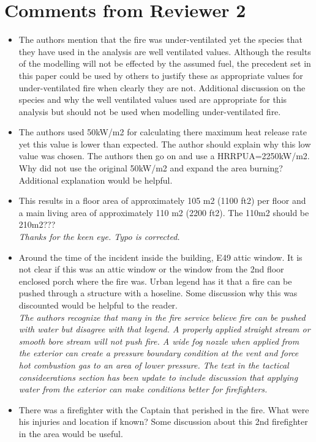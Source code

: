 \documentclass[12pt]{article}
\begin{document}
\section{Comments from Reviewer 2}
\begin{itemize}
 \item The authors mention that the fire was under-ventilated yet the species that they have used in the analysis are well ventilated values.  Although the results of the modelling will not be effected by the assumed fuel, the precedent set in this paper could be used by others to justify these as appropriate values for under-ventilated fire when clearly they are not.  Additional discussion on the species and why the well ventilated values used are appropriate for this analysis but should not be used when modelling under-ventilated fire.
\item The authors used 50kW/m2 for calculating there maximum heat release rate yet this value is lower than expected.  The author should explain why this low value was chosen.  The authors then go on and use a HRRPUA=2250kW/m2.  Why did not use the original 50kW/m2 and expand the area burning?  Additional explanation would be helpful.
\item This results in a floor area of approximately 105 m2 (1100 ft2) per floor and a main living area of approximately 110 m2 (2200 ft2).
The 110m2 should be 210m2??? \\
{\it Thanks for the keen eye. Typo is corrected.}
\item  Around the time of the incident inside the building, E49 attic window.  It is not clear if this was an attic window or the window from the 2nd floor enclosed porch where the fire was.  Urban legend has it that a fire can be pushed through a structure with a hoseline.  Some discussion why this was discounted would be helpful to the reader. \\
{\it The authors recognize that many in the fire service believe fire can be pushed with water but disagree with that legend. A properly applied straight stream or smooth bore stream will not push fire. A wide fog nozzle when applied from the exterior can create a pressure boundary condition at the vent and force hot combustion gas to an area of lower pressure. The text in the tactical consideerations section has been update to include discussion that applying water from the exterior can make conditions better for firefighters.}
\item There was a firefighter with the Captain that perished in the fire.  What were his injuries and location if known?  Some discussion about this 2nd firefighter in the area would be useful. \\

\end{itemize}
\end{document}
